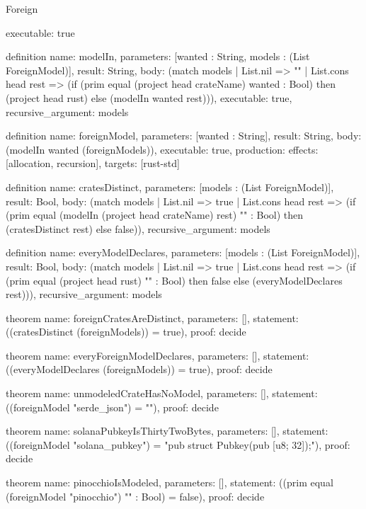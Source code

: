 \begin{lexlean}{Foreign}
\begin{semanticmodule}
{  executable: true
}

definition{
  name: modelIn,
  parameters: [wanted : String, models : (List ForeignModel)],
  result: String,
  body: (match models
    | List.nil => ""
    | List.cons head rest => (if (prim equal (project head crateName) wanted : Bool) then (project head rust) else (modelIn wanted rest))),
  executable: true,
  recursive_argument: models
}

definition{
  name: foreignModel,
  parameters: [wanted : String],
  result: String,
  body: (modelIn wanted (foreignModels)),
  executable: true,
  production: {effects: [allocation, recursion], targets: [rust-std]}
}

definition{
  name: cratesDistinct,
  parameters: [models : (List ForeignModel)],
  result: Bool,
  body: (match models
    | List.nil => true
    | List.cons head rest => (if (prim equal (modelIn (project head crateName) rest) "" : Bool) then (cratesDistinct rest) else false)),
  recursive_argument: models
}

definition{
  name: everyModelDeclares,
  parameters: [models : (List ForeignModel)],
  result: Bool,
  body: (match models
    | List.nil => true
    | List.cons head rest => (if (prim equal (project head rust) "" : Bool) then false else (everyModelDeclares rest))),
  recursive_argument: models
}

theorem{
  name: foreignCratesAreDistinct,
  parameters: [],
  statement: ((cratesDistinct (foreignModels)) = true),
  proof: decide{}
}

theorem{
  name: everyForeignModelDeclares,
  parameters: [],
  statement: ((everyModelDeclares (foreignModels)) = true),
  proof: decide{}
}

theorem{
  name: unmodeledCrateHasNoModel,
  parameters: [],
  statement: ((foreignModel "serde_json") = ""),
  proof: decide{}
}

theorem{
  name: solanaPubkeyIsThirtyTwoBytes,
  parameters: [],
  statement: ((foreignModel "solana_pubkey") = "pub struct Pubkey(pub [u8; 32]);"),
  proof: decide{}
}

theorem{
  name: pinocchioIsModeled,
  parameters: [],
  statement: ((prim equal (foreignModel "pinocchio") "" : Bool) = false),
  proof: decide{}
}
\end{semanticmodule}
\end{lexlean}
